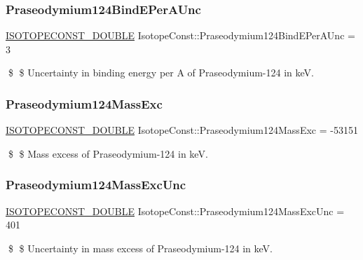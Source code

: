 \subsubsection{\texorpdfstring{Praseodymium124\+Bind\+E\+Per\+A\+Unc}{Praseodymium124BindEPerAUnc}}
{\footnotesize\ttfamily \mbox{\hyperlink{group___isotope_const-_macros_ga8f45a7272ce02c0b4c65c44636ed719a}{I\+S\+O\+T\+O\+P\+E\+C\+O\+N\+S\+T\+\_\+\+D\+O\+U\+B\+LE}} Isotope\+Const\+::\+Praseodymium124\+Bind\+E\+Per\+A\+Unc = 3}

\$ \$ Uncertainty in binding energy per A of Praseodymium-\/124 in keV. \mbox{\label{group___isotope_const-_praseodymium-_pr124_gade93f8f20d99c4907a37d96afdb9747c}} 
\subsubsection{\texorpdfstring{Praseodymium124\+Mass\+Exc}{Praseodymium124MassExc}}
{\footnotesize\ttfamily \mbox{\hyperlink{group___isotope_const-_macros_ga8f45a7272ce02c0b4c65c44636ed719a}{I\+S\+O\+T\+O\+P\+E\+C\+O\+N\+S\+T\+\_\+\+D\+O\+U\+B\+LE}} Isotope\+Const\+::\+Praseodymium124\+Mass\+Exc = -\/53151}

\$ \$ Mass excess of Praseodymium-\/124 in keV. \mbox{\label{group___isotope_const-_praseodymium-_pr124_ga1ac3b11ffff792ec35916b7164ccadce}} 
\subsubsection{\texorpdfstring{Praseodymium124\+Mass\+Exc\+Unc}{Praseodymium124MassExcUnc}}
{\footnotesize\ttfamily \mbox{\hyperlink{group___isotope_const-_macros_ga8f45a7272ce02c0b4c65c44636ed719a}{I\+S\+O\+T\+O\+P\+E\+C\+O\+N\+S\+T\+\_\+\+D\+O\+U\+B\+LE}} Isotope\+Const\+::\+Praseodymium124\+Mass\+Exc\+Unc = 401}

\$ \$ Uncertainty in mass excess of Praseodymium-\/124 in keV. \mbox{\label{group___isotope_const-_praseodymium-_pr124_gac78f81015d299680309a137aff5ea924}} 
